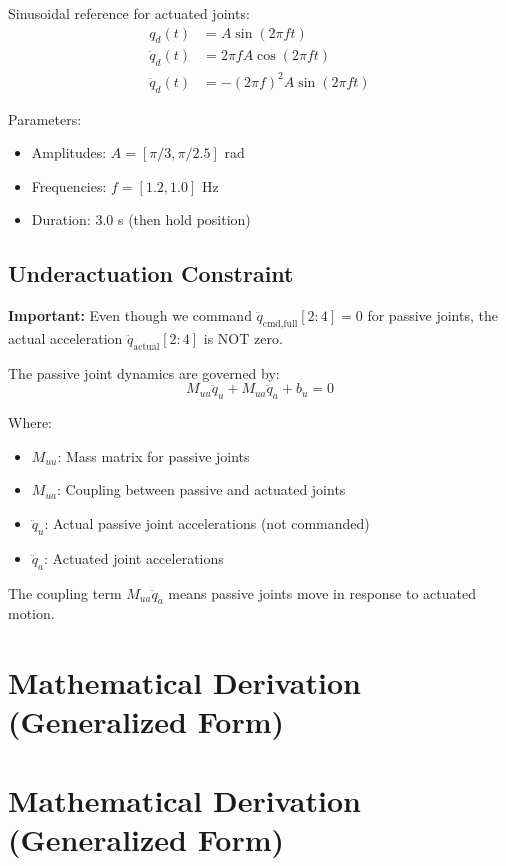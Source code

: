 Sinusoidal reference for actuated joints:
\begin{align}
q_d(t) &= A \sin(2\pi f t) \\
\dot{q}_d(t) &= 2\pi f A \cos(2\pi f t) \\
\ddot{q}_d(t) &= -(2\pi f)^2 A \sin(2\pi f t)
\end{align}

Parameters:
\begin{itemize}
\item Amplitudes: $A = [\pi/3, \pi/2.5]$ rad
\item Frequencies: $f = [1.2, 1.0]$ Hz
\item Duration: 3.0 s (then hold position)
\end{itemize}

\subsection*{Underactuation Constraint}

\textbf{Important:} Even though we command $\ddot{q}_{\text{cmd,full}}[2:4] = 0$ for passive joints, the actual acceleration $\ddot{q}_{\text{actual}}[2:4]$ is NOT zero.

The passive joint dynamics are governed by:
\begin{equation}
M_{uu}\ddot{q}_u + M_{ua}\ddot{q}_a + b_u = 0
\end{equation}

Where:
\begin{itemize}
\item $M_{uu}$: Mass matrix for passive joints
\item $M_{ua}$: Coupling between passive and actuated joints
\item $\ddot{q}_u$: Actual passive joint accelerations (not commanded)
\item $\ddot{q}_a$: Actuated joint accelerations
\end{itemize}

The coupling term $M_{ua}\ddot{q}_a$ means passive joints move in response to actuated motion.

\section*{Mathematical Derivation (Generalized Form)}

\section*{Mathematical Derivation (Generalized Form)}

